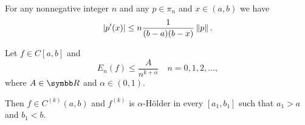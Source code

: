 \begin{theorem}\label{thm:bernsteins_algebraic_inequality}
  For any nonnegative integer \( n \) and any \( p \in \pi_n \) and \( x \in (a, b) \) we have
  \begin{equation*}
    \left\vert p'(x) \right\vert \leq n \frac 1 {(b - a)(b - x)} \left\Vert p \right\Vert.
  \end{equation*}
\end{theorem}

\begin{theorem}\label{thm:bernsteins_algebraic_theorem}
  Let \( f \in C[a, b] \) and
  \begin{equation*}
    E_n(f) \leq \frac A {n^{k+\alpha}} \quad n = 0, 1, 2, \ldots,
  \end{equation*}
  where \( A \in \BR \) and \( \alpha \in (0, 1) \).

  Then \( f \in C^{(k)}(a, b) \) and \( f^{(k)} \) is \( \alpha \)-H\"older in every \( [a_1, b_1] \) such that \( a_1 > a \) and \( b_1 < b \).
\end{theorem}
